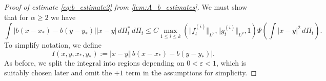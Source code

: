 \documentclass[10pt,oneside]{amsart}
\numberwithin{equation}{section}
\numberwithin{definition}{section}
\numberwithin{theorem}{section}
\numberwithin{lemma}{section}
\begin{document}
\begin{proof}[Proof of estimate \cref{eq:b_estimate2} from \cref{lem:A_b_estimates}]
  We must show that for $\alpha \geq 2$ we have
  \begin{equation*}
    \int\left|b(x-x_{*})-b(y-y_{*})\right||x-y|\,d\Pi_{t}^{*}\,d\Pi_{t}
    \leq C\max_{1\leq i \leq k}( \Vert f_{t}^{(i)}\Vert _{L^{p}},\Vert g_{t}^{(i)}\Vert _{L^{p}},1)
    \Psi\left(\int|x-y|^{2}\,d\Pi_{t}\right).
  \end{equation*}
  To simplify notation, we define
  \begin{equation*}
    I(x,y,x_{*},y_{*}):=|x-y|\left|b(x-x_{*})-b(y-y_{*})\right|.
  \end{equation*}
  As before, we split the integral into regions depending on $0<\varepsilon<1$, which is suitably chosen later and omit the $+1$ term in the assumptions for simplicity.
  

\end{proof}
\end{document}
